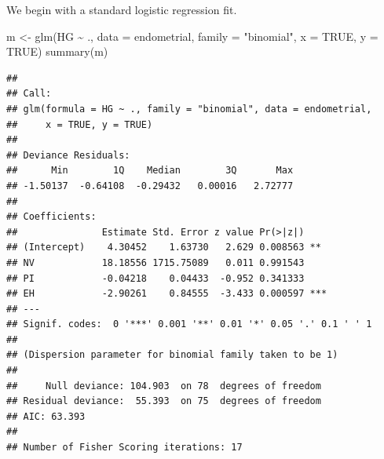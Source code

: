 \documentclass[
  ignorenonframetext,
]{beamer}
\newenvironment{Shaded}{\begin{snugshade}}{\end{snugshade}}
\newcommand{\AttributeTok}[1]{\textcolor[rgb]{0.77,0.63,0.00}{#1}}
\newcommand{\ConstantTok}[1]{\textcolor[rgb]{0.00,0.00,0.00}{#1}}
\newcommand{\FunctionTok}[1]{\textcolor[rgb]{0.00,0.00,0.00}{#1}}
\newcommand{\NormalTok}[1]{#1}
\newcommand{\OtherTok}[1]{\textcolor[rgb]{0.56,0.35,0.01}{#1}}
\newcommand{\SpecialCharTok}[1]{\textcolor[rgb]{0.00,0.00,0.00}{#1}}
\newcommand{\StringTok}[1]{\textcolor[rgb]{0.31,0.60,0.02}{#1}}
\begin{document}
\begin{frame}[fragile]{}
\protect\hypertarget{section-16}{}
We begin with a standard logistic regression fit.

\vspace{12pt}
\tiny

\begin{Shaded}
\begin{Highlighting}[]
\NormalTok{m }\OtherTok{\textless{}{-}} \FunctionTok{glm}\NormalTok{(HG }\SpecialCharTok{\textasciitilde{}}\NormalTok{ ., }\AttributeTok{data =}\NormalTok{ endometrial, }\AttributeTok{family =} \StringTok{"binomial"}\NormalTok{, }
         \AttributeTok{x =} \ConstantTok{TRUE}\NormalTok{, }\AttributeTok{y =} \ConstantTok{TRUE}\NormalTok{)}
\FunctionTok{summary}\NormalTok{(m)}
\end{Highlighting}
\end{Shaded}

\begin{verbatim}
## 
## Call:
## glm(formula = HG ~ ., family = "binomial", data = endometrial, 
##     x = TRUE, y = TRUE)
## 
## Deviance Residuals: 
##      Min        1Q    Median        3Q       Max  
## -1.50137  -0.64108  -0.29432   0.00016   2.72777  
## 
## Coefficients:
##               Estimate Std. Error z value Pr(>|z|)    
## (Intercept)    4.30452    1.63730   2.629 0.008563 ** 
## NV            18.18556 1715.75089   0.011 0.991543    
## PI            -0.04218    0.04433  -0.952 0.341333    
## EH            -2.90261    0.84555  -3.433 0.000597 ***
## ---
## Signif. codes:  0 '***' 0.001 '**' 0.01 '*' 0.05 '.' 0.1 ' ' 1
## 
## (Dispersion parameter for binomial family taken to be 1)
## 
##     Null deviance: 104.903  on 78  degrees of freedom
## Residual deviance:  55.393  on 75  degrees of freedom
## AIC: 63.393
## 
## Number of Fisher Scoring iterations: 17
\end{verbatim}
\end{frame}
\end{document}
